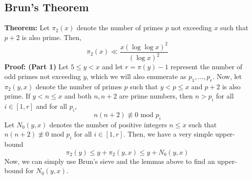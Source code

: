 \subsection{Brun's Theorem}
\begin{boxedsection}
    \textbf{Theorem:} Let $\pi_2(x)$ denote the number of primes $p$ not exceeding $x$ such that $p+2$ is also prime. Then,
    $$
    \pi_2(x) \ll \frac{x (\log \log x)^2}{(\log x)^2}
    $$
    \textbf{Proof: (Part 1)} Let $5 \leq y < x$ and let $r = \pi(y) - 1$ represent the number of odd primes not exceeding $y$, which we will also enumerate as $p_1, \dots, p_r$. Now, let $\pi_2(y,x)$ denote the 
    number of primes $p$ such that $y < p \leq x$ and $p+2$ is also prime. If $y < n \leq x$ and both $n, n+2$ are prime numbers, then $n > p_i$ for all $i \in [1,r]$ and for all $p_i$,
    $$
    n(n+2) \nequiv 0 \text{ mod } p_i
    $$
    Let $N_0(y,x)$ denotes the number of positive integers $n \leq x$ such that $n(n+2) \nequiv 0 \text{ mod } p_i$ for all $i \in [1,r]$. Then, we have a very simple upper-bound
    $$
    \pi_2(y) \leq y + \pi_2(y,x) \leq y + N_0(y,x)
    $$
    Now, we can simply use Brun's sieve and the lemmas above to find an upper-bound for $N_0(y,x)$.
\end{boxedsection}



